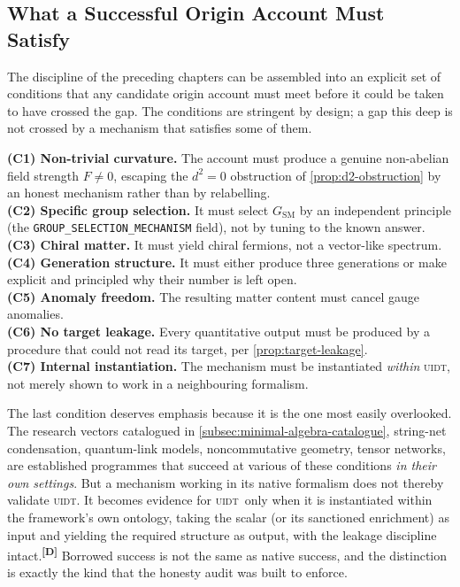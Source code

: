 \documentclass[12pt,a4paper,twoside]{article}
\theoremstyle{plain}
\theoremstyle{definition}
\theoremstyle{remark}
\newcommand{\UIDT}{\textsc{uidt}}
\newcommand{\catmark}[1]{\textsuperscript{\textsf{\textbf{[#1]}}}}
\begin{document}
\subsection{What a Successful Origin Account Must Satisfy}
\label{subsec:success-criteria}

The discipline of the preceding chapters can be assembled into an explicit set of conditions that any candidate origin account must meet before it could be taken to have crossed the gap. The conditions are stringent by design; a gap this deep is not crossed by a mechanism that satisfies some of them.

\begin{governancebox}
\textbf{(C1) Non-trivial curvature.} The account must produce a genuine non-abelian field strength $F \neq 0$, escaping the $d^2=0$ obstruction of
\cref{prop:d2-obstruction} by an honest mechanism rather than by relabelling.\\[0.3em]
\textbf{(C2) Specific group selection.} It must select $G_{\mathrm{SM}}$ by an independent principle (the \texttt{GROUP\_SELECTION\_MECHANISM} field), not by
tuning to the known answer.\\[0.3em]
\textbf{(C3) Chiral matter.} It must yield chiral fermions, not a vector-like
spectrum.\\[0.3em]
\textbf{(C4) Generation structure.} It must either produce three generations or
make explicit and principled why their number is left open.\\[0.3em]
\textbf{(C5) Anomaly freedom.} The resulting matter content must cancel gauge
anomalies.\\[0.3em]
\textbf{(C6) No target leakage.} Every quantitative output must be produced by a
procedure that could not read its target, per \cref{prop:target-leakage}.\\[0.3em]
\textbf{(C7) Internal instantiation.} The mechanism must be instantiated \emph{within} \UIDT, not merely shown to work in a neighbouring formalism.
\end{governancebox}

\noindent The last condition deserves emphasis because it is the one most easily overlooked. The research vectors catalogued in \cref{subsec:minimal-algebra-catalogue}, string-net condensation, quantum-link models, noncommutative geometry, tensor networks, are established programmes that succeed at various of these conditions \emph{in their own settings}. But a mechanism working in its native formalism does not thereby validate \UIDT. It becomes evidence for \UIDT\ only when it is instantiated within the framework's own ontology, taking the scalar (or its sanctioned enrichment) as input and yielding the required structure as output, with the leakage discipline intact.\catmark{D} Borrowed success is not the same as native success, and the distinction is exactly the kind that the honesty audit was built to enforce.
\end{document}
